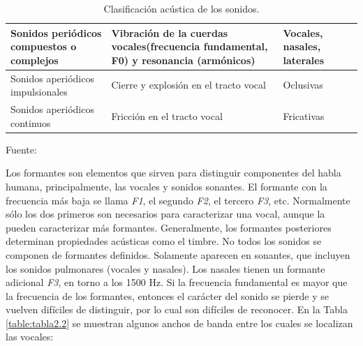 \begin{enumerate}
\begin{center}
\begin{table}[h!]
\centering
\caption{\small{Clasificación acústica de los sonidos.}}
\label{table:tabla2.1}
\vskip 0.2cm
\begin{tabular}{|p{4cm}|p{8cm}|p{3cm}|r|}
\hline
{\small Sonidos periódicos compuestos o complejos} & {\small Vibración de la cuerdas vocales(frecuencia fundamental, F0) y resonancia (armónicos)} & {\small Vocales, nasales, laterales}  \\ 
\hline 
{\small Sonidos aperiódicos impulsionales} & {\small Cierre y explosión en el tracto vocal} & {\small Oclusivas}  \\ 
\hline 
{\small Sonidos aperiódicos continuos} & {\small Fricción en el tracto vocal} & {\small Fricativas}  \\ 
\hline 
\end{tabular} 
\begin{center}
\vskip 0.2cm
{\small{Fuente: \cite{joaquim}}}
\end{center}
\end{table}
\end{center}

Los formantes son elementos que sirven para distinguir componentes del habla humana, principalmente, las vocales y sonidos sonantes. El formante con la frecuencia más baja se llama \textit{F1}, el segundo \textit{F2}, el tercero \textit{F3}, etc. Normalmente sólo los dos primeros son necesarios para caracterizar una vocal, aunque la pueden caracterizar más formantes. Generalmente, los formantes posteriores determinan propiedades acústicas como el timbre.
\newpage
No todos los sonidos se componen de formantes definidos. Solamente aparecen en sonantes, que incluyen los sonidos pulmonares (vocales y nasales). Los nasales tienen un formante adicional \textit{F3}, en torno a los 1500 Hz. Si la frecuencia fundamental es mayor que la frecuencia de los formantes, entonces el carácter del sonido se pierde y se vuelven difíciles de distinguir, por lo cual son difíciles de reconocer. En la Tabla \ref{table:tabla2.2} se muestran algunos anchos de banda entre los cuales se localizan las vocales:


\end{enumerate}
